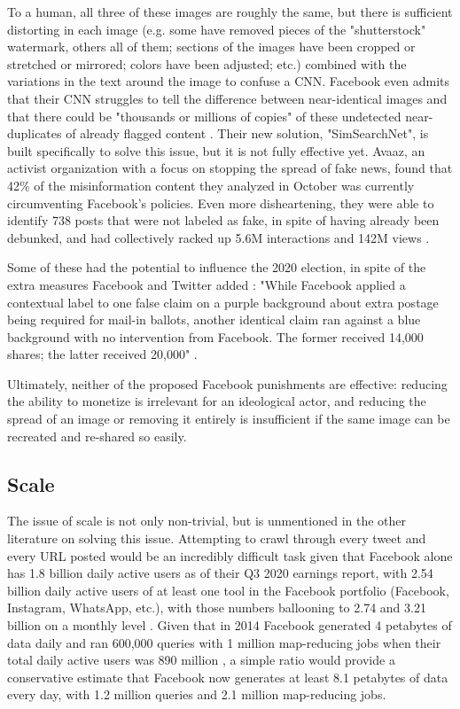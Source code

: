 \documentclass[NETN,manuscript]{stjour-new}
\begin{document}
To a human, all three of these images are roughly the same, but there is sufficient distorting in each image (e.g. some have removed pieces of the "shutterstock" watermark, others all of them; sections of the images have been cropped or stretched or mirrored; colors have been adjusted; etc.) combined with the variations in the text around the image to confuse a CNN. Facebook even admits that their CNN struggles to tell the difference between near-identical images and that there could be "thousands or millions of copies" of these undetected near-duplicates of already flagged content \citep{sumbaly2020using}. Their new solution, "SimSearchNet", is built specifically to solve this issue, but it is not fully effective yet. Avaaz, an activist organization with a focus on stopping the spread of fake news, found that 42\% of the misinformation content they analyzed in October was currently circumventing Facebook's policies. Even more disheartening, they were able to identify 738 posts that were not labeled as fake, in spite of having already been debunked, and had collectively racked up 5.6M interactions and 142M views \citep{schott2020brief}.

Some of these had the potential to influence the 2020 election, in spite of the extra measures Facebook and Twitter added \citep{dean2020facebook}: "While Facebook applied a contextual label to one false claim on a purple background about extra postage being required for mail-in ballots, another identical claim ran against a blue background with no intervention from Facebook. The former received 14,000 shares; the latter received 20,000" \citep{Fung2020facebook}.

Ultimately, neither of the proposed Facebook punishments are effective: reducing the ability to monetize is irrelevant for an ideological actor, and reducing the spread of an image or removing it entirely is insufficient if the same image can be recreated and re-shared so easily.

\subsection{Scale}
The issue of scale is not only non-trivial, but is unmentioned in the other literature on solving this issue. Attempting to crawl through every tweet and every URL posted would be an incredibly difficult task given that Facebook alone has 1.8 billion daily active users as of their Q3 2020 earnings report, with 2.54 billion daily active users of at least one tool in the Facebook portfolio (Facebook, Instagram, WhatsApp, etc.), with those numbers ballooning to 2.74 and 3.21 billion on a monthly level \citep{facebook2020q3}. Given that in 2014 Facebook generated 4 petabytes of data daily and ran 600,000 queries with 1 million map-reducing jobs when their total daily active users was 890 million \citep{bronson2015open}, a simple ratio would provide a conservative estimate that Facebook now generates at least 8.1 petabytes of data every day, with 1.2 million queries and 2.1 million map-reducing jobs. 
\end{document}
